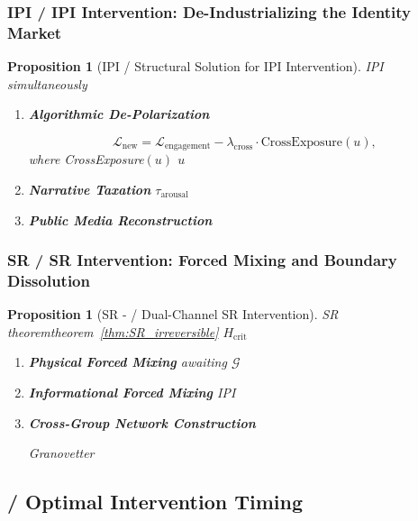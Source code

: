 \documentclass[11pt,a4paper]{article}
\newtheorem{proposition}[theorem]{Proposition}
\theoremstyle{remark}
\begin{document}
\subsubsection{IPI  / IPI Intervention: De-Industrializing the Identity Market}

\begin{proposition}[IPI  / Structural Solution for IPI Intervention]
\label{prop:IPI_intervention}
IPI \textbf{}simultaneously
\begin{enumerate}
    \item \textbf{Algorithmic De-Polarization}
          
          \[
          \mathcal{L}_{\text{new}} = \mathcal{L}_{\text{engagement}} - 
          \lambda_{\text{cross}} \cdot \text{CrossExposure}(u),
          \]
          where CrossExposure$(u)$  $u$ 
    \item \textbf{Narrative Taxation}
           $\tau_{\text{arousal}}$ 
          
    \item \textbf{Public Media Reconstruction}
          
\end{enumerate}
\end{proposition}

\subsubsection{SR  / SR Intervention: Forced Mixing and Boundary Dissolution}

\begin{proposition}[SR - / Dual-Channel SR Intervention]
\label{prop:SR_intervention}
SR theoremtheorem~\ref{thm:SR_irreversible} $H_{\text{crit}}$ 

\begin{enumerate}
    \item \textbf{Physical Forced Mixing}
          awaiting
           $\mathcal{G}$ 
    \item \textbf{Informational Forced Mixing}
           IPI 
    \item \textbf{Cross-Group Network Construction}
          
          Granovetter 
\end{enumerate}
\end{proposition}

\subsection{ / Optimal Intervention Timing}
\end{document}
